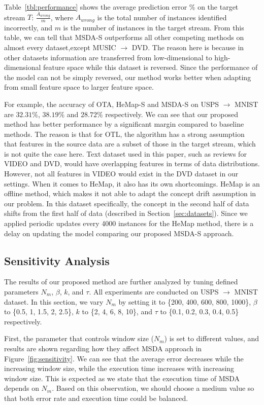 Table~\ref{tbl:performance} shows the average prediction error \% on the target stream $T$: $\frac{A_{wrong}}{m}$, where $A_{wrong}$ is the total number of instances identified incorrectly, and $m$ is the number of instances in the target stream. From this table, we can tell that MSDA-S outperforms all other competing methods on almost every dataset,except MUSIC $\rightarrow$ DVD. The reason here is because in other datasets information are transferred from low-dimensional to high-dimensional feature space while this dataset is reversed. Since the performance of the model can not be simply reversed, our method works better when adapting from small feature space to larger feature space. 

For example, the accuracy of OTA, HeMap-S and MSDA-S on USPS $\rightarrow$ MNIST are $32.31\%$, $38.19\%$ and $28.72\%$ respectively. 
We can see that our proposed method has better performance by a significant margin compared to baseline methods. The reason is that for OTL, the algorithm has a strong assumption that features in the source data are a subset of those in the target stream, which is not quite the case here.  
Text dataset used in this paper, such as reviews for VIDEO and DVD, would have overlapping features in terms of data distributions. However, not all features in VIDEO would exist in the DVD dataset in our settings. 
When it comes to HeMap, it also has its own shortcomings. HeMap is an offline method, which makes it not able to adapt the concept drift assumption in our problem. In this dataset specifically, the concept in the second half of data shifts from the first half of data (described in Section~\ref{sec:datasets}). Since we applied periodic updates every 4000 instances for the HeMap method, there is a delay on updating the model comparing our proposed MSDA-S approach.

\subsection{Sensitivity Analysis}
The results of our proposed method are further analyzed by tuning defined parameters $N_m$, $\beta$, $k$, and $\tau$. All experiments are conducted on USPS $\rightarrow$ MNIST dataset. In this section, we vary $N_m$ by setting it to \{200, 400, 600, 800, 1000\}, $\beta$ to \{0.5, 1, 1.5, 2, 2.5\},
$k$ to \{2, 4, 6, 8, 10\}, and  $\tau$ to \{0.1, 0.2, 0.3, 0.4, 0.5\} respectively.

First, the parameter that controls window size ($N_m$) is set to different values, and results are shown regarding how they affect MSDA approach in Figure~\ref{fig:sensitivity}. We can see that the average error decreases while the increasing window size, while the execution time increases with increasing window size. This is expected as we state that the execution time of MSDA depends on $N_m$. Based on this observation, we should choose a medium value so that both error rate and execution time could be balanced.

